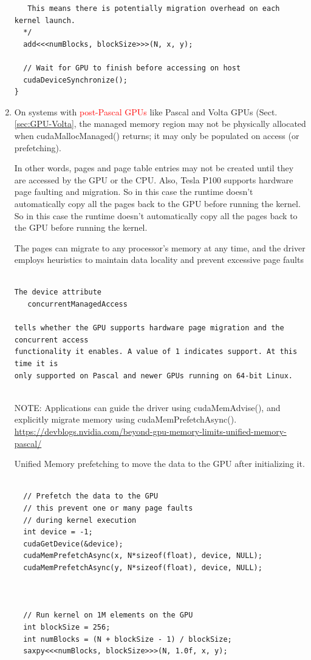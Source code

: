 \begin{enumerate}
\begin{lstlisting}
   This means there is potentially migration overhead on each kernel launch.
  */ 
  add<<<numBlocks, blockSize>>>(N, x, y);
 
  // Wait for GPU to finish before accessing on host
  cudaDeviceSynchronize();
}
\end{lstlisting}


  \item   On systems with \textcolor{red}{post-Pascal GPUs} like Pascal and
  Volta GPUs (Sect.\ref{sec:GPU-Volta}, the managed memory region may not be
  physically allocated when cudaMallocManaged() returns; it may only be
  populated on access (or prefetching).
  
 In other words, pages and page table entries may not be created until they are
 accessed by the GPU or the CPU. Also, Tesla P100 supports hardware page
 faulting and migration. So in this case the runtime doesn’t automatically copy
 all the pages back to the GPU before running the kernel. So in this case the
 runtime doesn’t automatically copy all the pages back to the GPU before running
 the kernel.
  
 The pages can migrate to any processor’s memory at any time, and the driver
 employs heuristics to maintain data locality and prevent excessive page faults
 
 \begin{verbatim}
 
The device attribute 
   concurrentManagedAccess 

tells whether the GPU supports hardware page migration and the concurrent access
functionality it enables. A value of 1 indicates support. At this time it is
only supported on Pascal and newer GPUs running on 64-bit Linux.
 
 \end{verbatim}
 
 
 NOTE: Applications can guide the driver using cudaMemAdvise(), 
 and explicitly migrate memory using cudaMemPrefetchAsync().
 \url{https://devblogs.nvidia.com/beyond-gpu-memory-limits-unified-memory-pascal/}
 
 \label{sec:cudaMemPrefetchAsync()}
  Unified Memory prefetching to move the data to the GPU after initializing it. 
 \begin{lstlisting}
 
  // Prefetch the data to the GPU
  // this prevent one or many page faults
  // during kernel execution
  int device = -1;
  cudaGetDevice(&device);
  cudaMemPrefetchAsync(x, N*sizeof(float), device, NULL);
  cudaMemPrefetchAsync(y, N*sizeof(float), device, NULL);

  
  
  // Run kernel on 1M elements on the GPU
  int blockSize = 256;
  int numBlocks = (N + blockSize - 1) / blockSize;
  saxpy<<<numBlocks, blockSize>>>(N, 1.0f, x, y);
  
 \end{lstlisting}
 
 
\end{enumerate}





